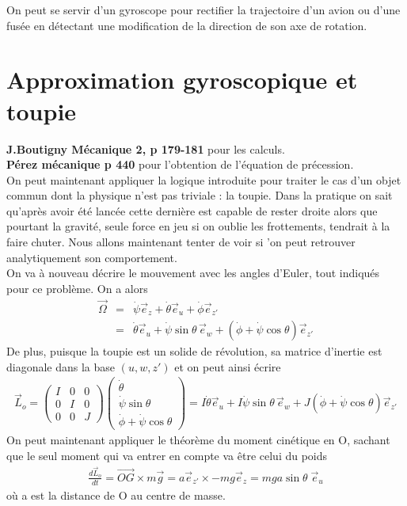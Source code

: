\documentclass[12pt,prb,aps,epsf]{article}
\begin{document}
On peut se servir d'un gyroscope pour rectifier la trajectoire d'un avion ou d'une fusée en détectant une modification de la direction de son axe de rotation.


\section{Approximation gyroscopique et toupie}
\textbf{J.Boutigny Mécanique 2, p 179-181} pour les calculs.\\
\textbf{Pérez mécanique p 440} pour l'obtention de l'équation de précession.\\

On peut maintenant appliquer la logique introduite pour traiter le cas d'un objet commun dont la physique n'est pas triviale : la toupie. Dans la pratique on sait qu'après avoir été lancée cette dernière est capable de rester droite alors que pourtant la gravité, seule force en jeu si on oublie les frottements, tendrait à la faire chuter. Nous allons maintenant tenter de voir si 'on peut retrouver analytiquement son comportement.\\

On va à nouveau décrire le mouvement avec les angles d'Euler, tout indiqués pour ce problème. On a alors
\begin{eqnarray}
\vec{\Omega} &=& \dot{\psi} \vec{e}_z + \dot{\theta} \vec{e}_u + \dot{\phi} \vec{e}_{z'} \\
&=& \dot{\theta} \vec{e}_u + \dot{\psi}\sin{\theta}\, \vec{e}_w + (\dot{\phi} + \dot{\psi}\cos{\theta} ) \vec{e}_{z'}
\end{eqnarray}
De plus, puisque la toupie est un solide de révolution, sa matrice d'inertie est diagonale dans la base $(u ,w ,z')$ et on peut ainsi écrire 
\begin{eqnarray}
\vec{L}_o = 
\begin{pmatrix}
I & 0 & 0\\
0 & I & 0\\
0 & 0 & J
\end{pmatrix}
\begin{pmatrix}
\dot{\theta}\\
\dot{\psi} \sin \theta\\
\dot{\phi} + \dot{\psi} \cos \theta
\end{pmatrix}
 = I\dot{\theta} \vec{e}_u + I\dot{\psi}\sin{\theta}\, \vec{e}_w + J(\dot{\phi} + \dot{\psi}\cos{\theta} ) \vec{e}_{z'}
\end{eqnarray}
On peut maintenant appliquer le théorème du moment cinétique en O, sachant que le seul moment qui va entrer en compte va être celui du poids
\begin{eqnarray}
\frac{d\vec{L}_o}{dt} = \vec{OG}\times m\vec{g} = a \vec{e}_{z'}\times -mg\vec{e}_z =  mga\sin{\theta}\;\vec{e}_u \label{eq1}
\end{eqnarray}
où a est la distance de O au centre de masse.\\
\end{document}
